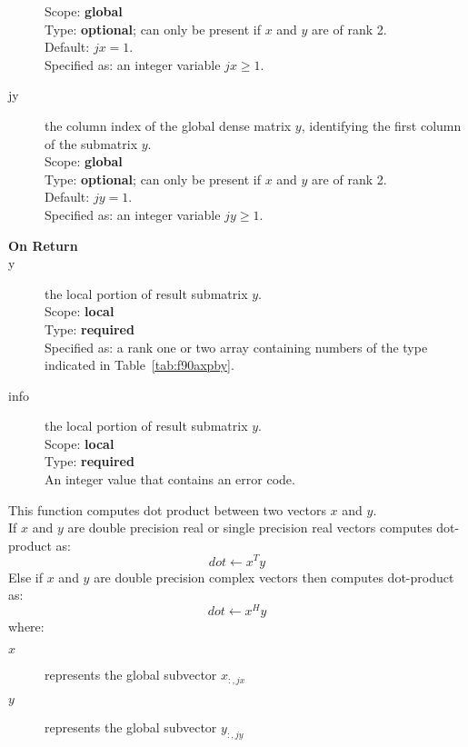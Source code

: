 \begin{description}
Scope: {\bf global} \\
Type: {\bf optional}; can only be present if $x$ and $y$ are of rank 2.\\
Default: $jx = 1$.\\
Specified as: an integer variable $jx\ge 1$. 
\item[jy]  the column index of the global dense matrix $y$,
identifying the first column of the submatrix $y$.\\
Scope: {\bf global} \\
Type: {\bf optional}; can only be present if $x$ and $y$ are of rank 2.\\
Default: $jy = 1$.\\
Specified as: an integer variable $jy\ge 1$. 

\end{description}

\begin{description}
\item[\bf On Return]
\item[y] the local portion of result submatrix $y$.\\
Scope: {\bf local} \\
Type: {\bf required} \\
Specified as: a rank one or two array containing numbers of the type
indicated in Table~\ref{tab:f90axpby}.
\item[info] the local portion of result submatrix $y$.\\
Scope: {\bf local} \\
Type: {\bf required} \\
An integer value that contains an error code. 
\end{description}


%
%


This function computes dot product between two vectors $x$ and
$y$.\\
If $x$ and $y$ are double precision real or single precision real vectors
computes dot-product as:
\[dot \leftarrow x^T y\]
Else if $x$ and $y$ are double precision complex vectors then computes dot-product as:
\[dot \leftarrow x^H y\]
where:
\begin{description}
\item[$x$] represents the global subvector $x_{:,jx}$
\item[$y$] represents the global subvector $y_{:,jy}$
\end{description}

